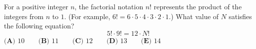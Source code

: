 For a positive integer $n$, the factorial notation $n!$ represents the product of the integers from $n$ to $1$. (For example, $6!=6\cdot5\cdot4\cdot3\cdot2\cdot1$.) What value of $N$ satisfies the following equation?
\[5!\cdot9!=12\cdot N!\]
$\textbf{(A) }10 \qquad \textbf{(B) }11 \qquad \textbf{(C) }12 \qquad \textbf{(D) }13 \qquad \textbf{(E) }14$
